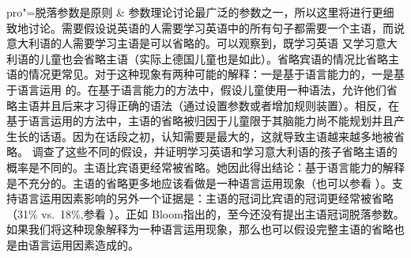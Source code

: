 pro"=脱落参数是原则 \& 参数理论讨论最广泛的参数之一，所以这里将进行更细致地讨论。需要假设说英语的人需要学习英语中的所有句子都需要一个主语，而说意大利语的人需要学习主语是可以省略的。可以观察到，既学习英语 又学习意大利语的儿童也会省略主语（实际上德国儿童也是如此）。省略宾语的情况比省略主语的情况更常见。对于这种现象有两种可能的解释：一是基于语言能力的，一是基于语言运用 的。在基于语言能力的方法中，假设儿童使用一种语法，允许他们省略主语并且后来才习得正确的语法（通过设置参数或者增加规则装置）。相反，在基于语言运用的方法中，主语的省略被归因于儿童限于其脑能力尚不能规划并且产生长的话语。因为在话段之初，认知需要是最大的，这就导致主语越来越多地被省略。  \citet{Valian91a}调查了这些不同的假设，并证明学习英语和学习意大利语的孩子省略主语的概率是不同的。主语比宾语更经常被省略。她因此得出结论：基于语言能力的解释是不充分的。主语的省略更多地应该看做是一种语言运用现象（也可以参看 \citealp{Bloom93a}）。支持语言运用因素影响的另外一个证据是：主语的冠词比宾语的冠词更经常被省略（31\% vs.\ 18\%,参看 \citealp[]{Gerken91a}）。正如 Bloom指出的，至今还没有提出主语冠词脱落参数。如果我们将这种现象解释为一种语言运用现象，那么也可以假设完整主语的省略也是由语言运用因素造成的。
